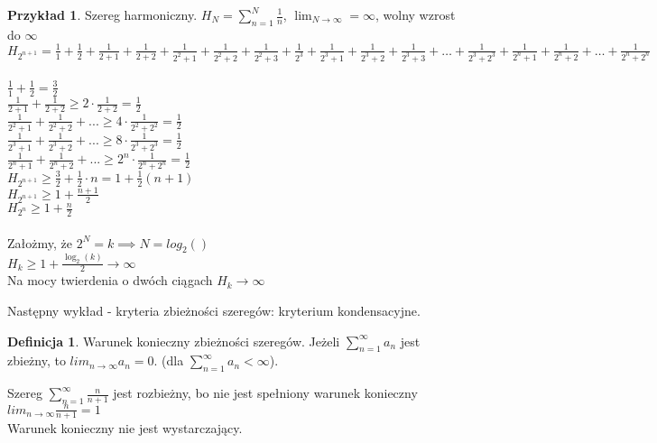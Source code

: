 \documentclass{article}
\theoremstyle{definition}
\newtheorem{de}{Definicja}[subsection]
\theoremstyle{definition}
\theoremstyle{definition}
\newtheorem{pk}{Przykład}[subsection]
\theoremstyle{definition}
\begin{document}
\begin{pk}
Szereg harmoniczny.
$H_N = \sum_{n=1}^{N} \frac{1}{n}$, $\lim_{N\rightarrow \infty}=\infty$, wolny wzrost do $\infty$\\
$H_{2^{n+1}}=\frac{1}{1} + \frac{1}{2} + \frac{1}{2+1} + \frac{1}{2+2} + \frac{1}{2^2 + 1} + \frac{1}{2^2+2} + \frac{1}{2^2+3} + \frac{1}{2^3} + \frac{1}{2^3+1} + \frac{1}{2^3 + 2} + \frac{1}{2^3 + 3} + \dots + \frac{1}{2^3 + 2^3} + \frac{1}{2^n + 1} + \frac{1}{2^n + 2} + \dots + \frac{1}{2^n+2^n}$\\\\
$\frac{1}{1}+\frac{1}{2}=\frac{3}{2}$\\
$\frac{1}{2+1}+\frac{1}{2+2}\geq 2\cdot \frac{1}{2+2}=\frac{1}{2}$\\
$\frac{1}{2^2+1}+\frac{1}{2^2+2} + ... \geq 4\cdot \frac{1}{2^2 + 2^2}=\frac{1}{2}$\\
$\frac{1}{2^3+1}+\frac{1}{2^3+2} + ... \geq 8\cdot \frac{1}{2^3 + 2^3}=\frac{1}{2}$\\
$\frac{1}{2^n+1}+\frac{1}{2^n+2} + ... \geq 2^{n}\cdot \frac{1}{2^n + 2^n}=\frac{1}{2}$\\
$H_{2^{n+1}}\geq \frac{3}{2} + \frac{1}{2} \cdot n = 1 + \frac{1}{2} (n+1)$\\
$H_{2^{n+1}}\geq 1 + \frac{n+1}{2}$\\
$H_{2^n}\geq 1 + \frac{n}{2}$\\\\
Założmy, że $2^N=k \implies N=log_2()$\\
$H_{k}\geq 1 + \frac{\log_2(k)}{2} \rightarrow \infty$\\
Na mocy twierdenia o dwóch ciągach $H_k \rightarrow \infty$
\end{pk}

Następny wykład - kryteria zbieżności szeregów: kryterium kondensacyjne.

\begin{de}
    Warunek konieczny zbieżności szeregów. Jeżeli $\sum_{n=1}^{\infty} a_n$ jest zbieżny, to $lim_{n\rightarrow \infty} a_n = 0$. (dla $\sum_{n=1}^{\infty} a_n < \infty$).
\end{de}

Szereg $\sum_{n=1}^{\infty} \frac{n}{n+1}$ jest rozbieżny, bo nie jest spełniony warunek konieczny\\ $lim_{n\rightarrow \infty} \frac{n}{n+1}=1$\\
Warunek konieczny nie jest wystarczający.
\end{document}
